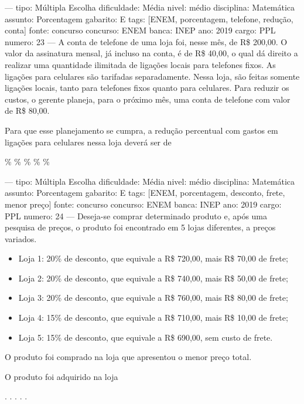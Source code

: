 ---
tipo: Múltipla Escolha
dificuldade: Média
nivel: médio
disciplina: Matemática
assunto: Porcentagem
gabarito: E
tags: [ENEM, porcentagem, telefone, redução, conta]
fonte: concurso
concurso: ENEM
banca: INEP
ano: 2019
cargo: PPL
numero: 23
---
\question
A conta de telefone de uma loja foi, nesse mês, de R\$ 200,00. O valor da assinatura mensal, já incluso na conta, é de R\$ 40,00, o qual dá direito a realizar uma quantidade ilimitada de ligações locais para telefones fixos. As ligações para celulares são tarifadas separadamente. Nessa loja, são feitas somente ligações locais, tanto para telefones fixos quanto para celulares. Para reduzir os custos, o gerente planeja, para o próximo mês, uma conta de telefone com valor de R\$ 80,00.

Para que esse planejamento se cumpra, a redução percentual com gastos em ligações para celulares nessa loja deverá ser de
\begin{choices}
\%
\%
\%
\%
\%
\end{choices}

---
tipo: Múltipla Escolha
dificuldade: Média
nivel: médio
disciplina: Matemática
assunto: Porcentagem
gabarito: E
tags: [ENEM, porcentagem, desconto, frete, menor preço]
fonte: concurso
concurso: ENEM
banca: INEP
ano: 2019
cargo: PPL
numero: 24
---
\question
Deseja-se comprar determinado produto e, após uma pesquisa de preços, o produto foi encontrado em 5 lojas diferentes, a preços variados.

\begin{itemize}
\item Loja 1: 20\% de desconto, que equivale a R\$ 720,00, mais R\$ 70,00 de frete;
\item Loja 2: 20\% de desconto, que equivale a R\$ 740,00, mais R\$ 50,00 de frete;
\item Loja 3: 20\% de desconto, que equivale a R\$ 760,00, mais R\$ 80,00 de frete;
\item Loja 4: 15\% de desconto, que equivale a R\$ 710,00, mais R\$ 10,00 de frete;
\item Loja 5: 15\% de desconto, que equivale a R\$ 690,00, sem custo de frete.
\end{itemize}

O produto foi comprado na loja que apresentou o menor preço total.

O produto foi adquirido na loja
\begin{choices}
.
.
.
.
.
\end{choices}

